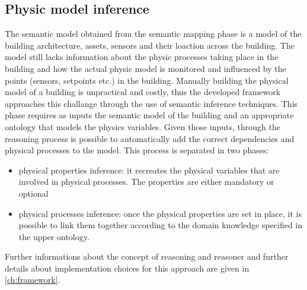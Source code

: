 \subsection{Physic model inference}
The semantic model obtained from the semantic mapping phase is a model of the building architecture, assets, sensors and their loaction across the building. The model still lacks information about the physic processes taking place in the building and how the actual physic model is monitored and influenced by the points (sensors, setpoints etc.) in the building. Manually building the physical model of a building is unpractical and costly, thus the developed framework approaches this challange through the use of semantic inference techniques. This phase requires as inputs the semantic model of the building and an appropriate ontology that models the physics variables. %
Given those inputs, through the reasoning process is possible to automatically add the correct dependencies and physical processes to the model. This process is separated in two phases:
\begin{itemize}
  \item physical properties inference: it recreates the physical variables that are involved in physical processes. The properties are either mandatory or optional
  \item physical processes inference: once the physical properties are set in place, it is possible to link them together according to the domain knowledge specified in the upper ontology.
\end{itemize}
Further informations about the concept of reasoning and reasoner and further details about implementation choices for this approach are given in \autoref{ch:framework}.

